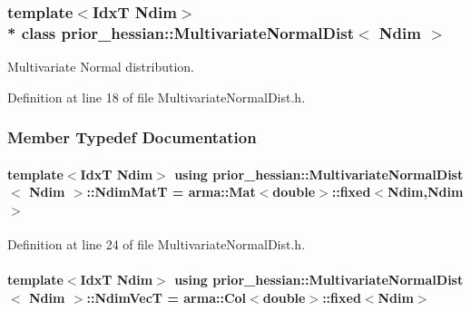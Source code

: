 \subsubsection*{template$<$IdxT Ndim$>$\\*
class prior\+\_\+hessian\+::\+Multivariate\+Normal\+Dist$<$ Ndim $>$}

Multivariate Normal distribution. 

Definition at line 18 of file Multivariate\+Normal\+Dist.\+h.



\subsubsection{Member Typedef Documentation}
\paragraph[{\texorpdfstring{Ndim\+MatT}{NdimMatT}}]{\setlength{\rightskip}{0pt plus 5cm}template$<$IdxT Ndim$>$ using {\bf prior\+\_\+hessian\+::\+Multivariate\+Normal\+Dist}$<$ Ndim $>$\+::{\bf Ndim\+MatT} =  arma\+::\+Mat$<$double$>$\+::fixed$<$Ndim,Ndim$>$}\hypertarget{classprior__hessian_1_1MultivariateNormalDist_a2aa1e12ff8819a2cc3a8d3f33bcf8de2}{}\label{classprior__hessian_1_1MultivariateNormalDist_a2aa1e12ff8819a2cc3a8d3f33bcf8de2}


Definition at line 24 of file Multivariate\+Normal\+Dist.\+h.

\paragraph[{\texorpdfstring{Ndim\+VecT}{NdimVecT}}]{\setlength{\rightskip}{0pt plus 5cm}template$<$IdxT Ndim$>$ using {\bf prior\+\_\+hessian\+::\+Multivariate\+Normal\+Dist}$<$ Ndim $>$\+::{\bf Ndim\+VecT} =  arma\+::\+Col$<$double$>$\+::fixed$<$Ndim$>$}\hypertarget{classprior__hessian_1_1MultivariateNormalDist_a0f5725cbbfa47be45b2741467dcd5615}{}\label{classprior__hessian_1_1MultivariateNormalDist_a0f5725cbbfa47be45b2741467dcd5615}


